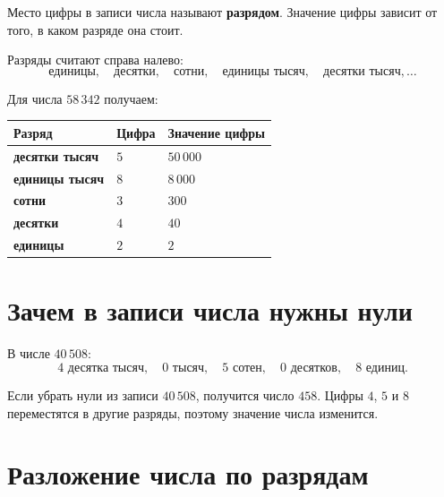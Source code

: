 \begin{propertybox}
  Место цифры в записи числа называют \textbf{разрядом}. Значение цифры
  зависит от того, в каком разряде она стоит.
\end{propertybox}

Разряды считают справа налево:
\[
  \text{единицы},\quad
  \text{десятки},\quad
  \text{сотни},\quad
  \text{единицы тысяч},\quad
  \text{десятки тысяч},\ldots
\]

\placevaluefigure

Для числа \(58\,342\) получаем:

\begin{center}
  \renewcommand{\arraystretch}{1.35}
  \begin{tabularx}{0.92\textwidth}{@{}>{\bfseries\sffamily}X>{\centering\arraybackslash}p{}>{\centering\arraybackslash}p{}@{}}
    \toprule
    \rowcolor{TableHeader}
    Разряд & Цифра & Значение цифры \\
    \midrule
    десятки тысяч & \(5\) & \(50\,000\) \\
    единицы тысяч & \(8\) & \(8\,000\) \\
    сотни & \(3\) & \(300\) \\
    десятки & \(4\) & \(40\) \\
    единицы & \(2\) & \(2\) \\
    \bottomrule
  \end{tabularx}
\end{center}

\section{Зачем в записи числа нужны нули}

\zeroplacefigure

В числе \(40\,508\):
\[
  4\text{ десятка тысяч},\quad
  0\text{ тысяч},\quad
  5\text{ сотен},\quad
  0\text{ десятков},\quad
  8\text{ единиц}.
\]

\begin{warningbox}
  Если убрать нули из записи \(40\,508\), получится число \(458\).
  Цифры \(4\), \(5\) и \(8\) переместятся в другие разряды, поэтому
  значение числа изменится.
\end{warningbox}

\section{Разложение числа по разрядам}

